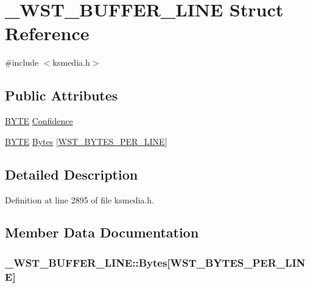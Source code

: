 \hypertarget{struct___w_s_t___b_u_f_f_e_r___l_i_n_e}{}\section{\+\_\+\+W\+S\+T\+\_\+\+B\+U\+F\+F\+E\+R\+\_\+\+L\+I\+NE Struct Reference}
\label{struct___w_s_t___b_u_f_f_e_r___l_i_n_e}


{\ttfamily \#include $<$ksmedia.\+h$>$}

\subsection*{Public Attributes}
\begin{DoxyCompactItemize}
\item 
\hyperlink{mapinls_8h_a4ae1dab0fb4b072a66584546209e7d58}{B\+Y\+TE} \hyperlink{struct___w_s_t___b_u_f_f_e_r___l_i_n_e_aff2cd1c7844a9c14e1c50a7e9362e640}{Confidence}
\item 
\hyperlink{mapinls_8h_a4ae1dab0fb4b072a66584546209e7d58}{B\+Y\+TE} \hyperlink{struct___w_s_t___b_u_f_f_e_r___l_i_n_e_a517c655350b3933e00c68beb9ab51c2c}{Bytes} \mbox{[}\hyperlink{ksmedia_8h_a6d33b63282358a4890ea1016023bea3d}{W\+S\+T\+\_\+\+B\+Y\+T\+E\+S\+\_\+\+P\+E\+R\+\_\+\+L\+I\+NE}\mbox{]}
\end{DoxyCompactItemize}


\subsection{Detailed Description}


Definition at line 2895 of file ksmedia.\+h.



\subsection{Member Data Documentation}
\subsubsection[{\texorpdfstring{Bytes}{Bytes}}]{ \+\_\+\+W\+S\+T\+\_\+\+B\+U\+F\+F\+E\+R\+\_\+\+L\+I\+N\+E\+::\+Bytes\mbox{[}{\bf W\+S\+T\+\_\+\+B\+Y\+T\+E\+S\+\_\+\+P\+E\+R\+\_\+\+L\+I\+NE}\mbox{]}}\hypertarget{struct___w_s_t___b_u_f_f_e_r___l_i_n_e_a517c655350b3933e00c68beb9ab51c2c}{}\label{struct___w_s_t___b_u_f_f_e_r___l_i_n_e_a517c655350b3933e00c68beb9ab51c2c}


